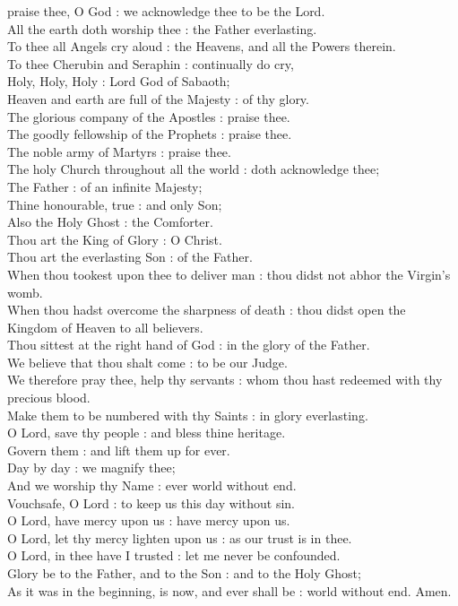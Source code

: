  praise thee, O God : we acknowledge thee to be the Lord.\\
All the earth doth worship thee : the Father everlasting.\\
To thee all Angels cry aloud : the Heavens, and all the Powers therein.\\
To thee Cherubin and Seraphin : continually do cry,\\
Holy, Holy, Holy : Lord God of Sabaoth;\\
Heaven and earth are full of the Majesty : of thy glory.\\
The glorious company of the Apostles : praise thee.\\
The goodly fellowship of the Prophets : praise thee.\\
The noble army of Martyrs : praise thee.\\
The holy Church throughout all the world : doth acknowledge thee;\\
The Father : of an infinite Majesty;\\
Thine honourable, true : and only Son;\\
Also the Holy Ghost : the Comforter.\\
Thou art the King of Glory : O Christ.\\
Thou art the everlasting Son : of the Father.\\
When thou tookest upon thee to deliver man : thou didst not abhor the Virgin's womb.\\
When thou hadst overcome the sharpness of death : thou didst open the Kingdom of Heaven to all believers.\\
Thou sittest at the right hand of God : in the glory of the Father.\\
We believe that thou shalt come : to be our Judge.\\
We therefore pray thee, help thy servants : whom thou hast redeemed with thy precious blood.\\
Make them to be numbered with thy Saints : in glory everlasting.\\
O Lord, save thy people : and bless thine heritage.\\
Govern them : and lift them up for ever.\\
Day by day : we magnify thee;\\
And we worship thy Name : ever world without end.\\
Vouchsafe, O Lord : to keep us this day without sin.\\
O Lord, have mercy upon us : have mercy upon us.\\
O Lord, let thy mercy lighten upon us : as our trust is in thee.\\
O Lord, in thee have I trusted : let me never be confounded.\\
Glory be to the Father, and to the Son : and to the Holy Ghost;\\
As it was in the beginning, is now, and ever shall be : world without end. Amen.

